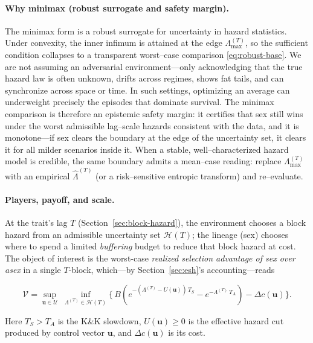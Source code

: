 \documentclass[11pt]{article}
\theoremstyle{upright}
\newcommand{\hazT}[1]{\Lambda^{(#1)}}          %
\newcommand{\hazmaxT}[1]{\Lambda^{(#1)}_{\max}}%
\begin{document}
\paragraph{Why minimax (robust surrogate and safety margin).}
The minimax form is a robust surrogate for uncertainty in hazard statistics. Under convexity, the inner infimum is attained at the edge
$\hazmaxT{T}$, so the sufficient condition collapses to a transparent worst–case comparison \eqref{eq:robust-base}. We are not assuming an
adversarial environment—only acknowledging that the true hazard law is often unknown, drifts across regimes, shows fat tails, and can
synchronize across space or time. In such settings, optimizing an average can underweight precisely the episodes that dominate survival.
The minimax comparison is therefore an epistemic safety margin: it certifies that sex still wins under the worst admissible lag–scale
hazards consistent with the data, and it is monotone—if sex clears the boundary at the edge of the uncertainty set, it clears it for all
milder scenarios inside it. When a stable, well–characterized hazard model is credible, the same boundary admits a mean–case reading:
replace $\hazmaxT{T}$ with an empirical $\widehat{\Lambda}^{(T)}$ (or a risk–sensitive entropic transform) and re–evaluate.

\paragraph{Players, payoff, and scale.}
At the trait’s lag $T$ (Section~\ref{sec:block-hazard}), the environment chooses a block hazard from an admissible uncertainty set $\mathcal H(T)$; the lineage (sex) chooses where to spend a limited \emph{buffering} budget to reduce that block hazard at cost. The object of interest is the worst-case \emph{realized selection advantage of sex over asex} in a single $T$-block, which—by Section~\ref{sec:esh}’s accounting—reads

\begin{equation}\label{eq:minimax}
\mathcal V =
\sup_{\mathbf u\in \mathcal U}\;
\inf_{\hazT{T}\in \mathcal H(T)}
\Big\{\,B\!\left(e^{-(\hazT{T}-U(\mathbf u))\,T_S}-e^{-\hazT{T}\,T_A}\right)-\Delta c(\mathbf u)\Big\}.
\end{equation}

Here $T_S>T_A$ is the K\&K slowdown, $U(\mathbf u)\ge 0$ is the effective hazard cut produced by control vector $\mathbf u$, and $\Delta c(\mathbf u)$ is its cost.
\end{document}

